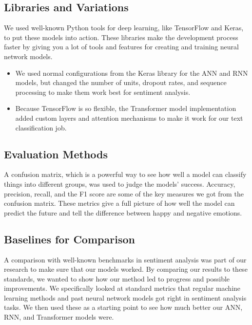 \documentclass[11pt,a4paper]{article}
\begin{document}
\subsection{Libraries and Variations}

We used well-known Python tools for deep learning, like TensorFlow and Keras, to put these models into action. These libraries make the development process faster by giving you a lot of tools and features for creating and training neural network models.

\begin{itemize}
    \item We used normal configurations from the Keras library for the ANN and RNN models, but changed the number of units, dropout rates, and sequence processing to make them work best for sentiment analysis.
    \item Because TensorFlow is so flexible, the Transformer model implementation added custom layers and attention mechanisms to make it work for our text classification job.
\end{itemize}

\subsection{Evaluation Methods}

A confusion matrix, which is a powerful way to see how well a model can classify things into different groups, was used to judge the models' success. Accuracy, precision, recall, and the F1 score are some of the key measures we got from the confusion matrix. These metrics give a full picture of how well the model can predict the future and tell the difference between happy and negative emotions.


\subsection{Baselines for Comparison}
A comparison with well-known benchmarks in sentiment analysis was part of our research to make sure that our models worked. By comparing our results to these standards, we wanted to show how our method led to progress and possible improvements. We specifically looked at standard metrics that regular machine learning methods and past neural network models got right in sentiment analysis tasks. We then used these as a starting point to see how much better our ANN, RNN, and Transformer models were.
\end{document}
